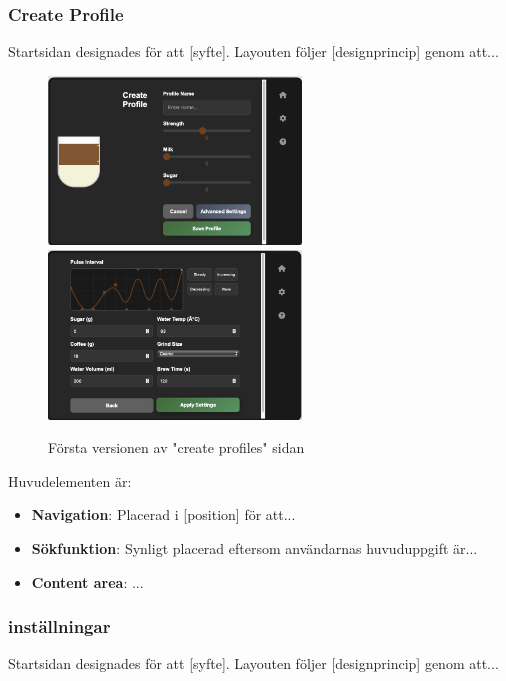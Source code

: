 \subsubsection{Create Profile}

Startsidan designades för att [syfte]. Layouten följer [designprincip] genom att...

\begin{figure}[H]
    \centering
    \includegraphics[width=0.6\textwidth]{bilder/brew.png}
    \includegraphics[width=0.6\textwidth]{bilder/advancedshit.png}
    \caption{Första versionen av "create profiles" sidan}
    \label{fig:create_v1}
\end{figure}

Huvudelementen är:
\begin{itemize}
    \item \textbf{Navigation}: Placerad i [position] för att...
    \item \textbf{Sökfunktion}: Synligt placerad eftersom användarnas huvuduppgift är...
    \item \textbf{Content area}: ...
\end{itemize}
\subsubsection{ inställningar }

Startsidan designades för att [syfte]. Layouten följer [designprincip] genom att...

